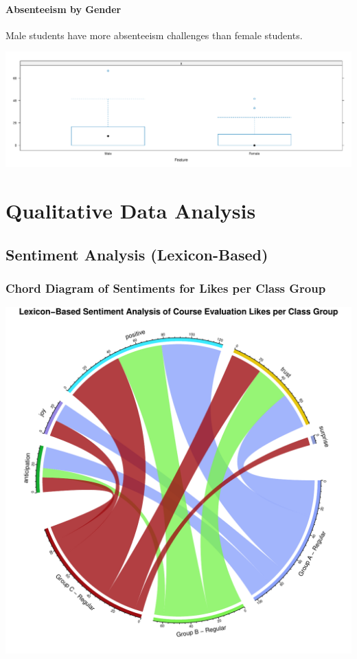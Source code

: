 \documentclass[
]{article}
\begin{document}
\newpage

\paragraph{Absenteeism by Gender}\label{absenteeism-by-gender}

Male students have more absenteeism challenges than female students.

\includegraphics{Mid-SemesterCourseEvaluation-20240819-20241125-ADB-BBIT2.2_files/figure-latex/AbsenteeismBoxandWhiskerGender-1.pdf}

\newpage

\section{Qualitative Data Analysis}\label{qualitative-data-analysis}

\subsection{Sentiment Analysis
(Lexicon-Based)}\label{sentiment-analysis-lexicon-based}

\subsubsection{Chord Diagram of Sentiments for Likes per Class
Group}\label{chord-diagram-of-sentiments-for-likes-per-class-group}

\includegraphics{Mid-SemesterCourseEvaluation-20240819-20241125-ADB-BBIT2.2_files/figure-latex/ChordDiagramLikesPerGroup-1.pdf}
\end{document}
